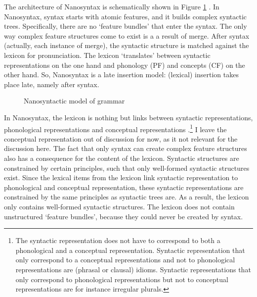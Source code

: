 The architecture of Nanosyntax is schematically shown in Figure \ref{fig:nano} \citep[from][]{vandenwyngaerd2020,caha2019}. In Nanosyntax, syntax starts with atomic features, and it builds complex syntactic trees. Specifically, there are no `feature bundles' that enter the syntax. The only way complex feature structures come to exist is a a result of merge.
After syntax (actually, each instance of merge), the syntactic structure is matched against the lexicon for pronunciation. The lexicon `translates' between syntactic representations on the one hand and phonology (PF) and concepts (CF) on the other hand. So, Nanosyntax is a late insertion model: (lexical) insertion takes place late, namely after syntax.

\begin{figure}[ht]
  \centering
  \caption{Nanosyntactic model of grammar}
  \label{fig:nano}
\end{figure}

In Nanosyntax, the lexicon is nothing but links between syntactic representations, phonological representations and conceptual representations \citep{starke2014}.\footnote{
The syntactic representation does not have to correspond to both a phonological and a conceptual representation. Syntactic representation that only correspond to a conceptual representations and not to phonological representations are (phrasal or clausal) idioms. Syntactic representations that only correspond to phonological representations but not to conceptual representations are for instance irregular plurals.
}
I leave the conceptual representation out of discussion for now, as it not relevant for the discussion here. The fact that only syntax can create complex feature structures also has a consequence for the content of the lexicon.
Syntactic structures are constrained by certain principles, such that only well-formed syntactic structures exist. Since the lexical items from the lexicon link syntactic representation to phonological and conceptual representation, these syntactic representations are constrained by the same principles as syntactic trees are. As a result, the lexicon only contains well-formed syntactic structures. The lexicon does not contain unstructured `feature bundles', because they could never be created by syntax.

